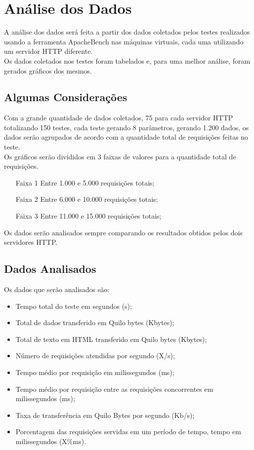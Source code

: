 \chapter{Análise dos Dados}\label{analise-dos-dados}

A análise dos dados será feita a partir dos dados coletados pelos testes realizados usando a ferramenta ApacheBench nas máquinas virtuais, cada uma utilizando um servidor HTTP diferente.\\
Os dados coletados nos testes foram tabelados e, para uma melhor análise, foram gerados gráficos dos mesmos.

\section{Algumas Considerações}
Com a grande quantidade de dados coletados, 75 para cada servidor HTTP totalizando 150 testes, cada teste gerando 8 parâmetros, gerando 1.200 dados, os dados serão agrupados de acordo com a quantidade total de requisições feitas no teste. \\
Os gráficos serão divididos em 3 faixas de valores para a quantidade total de requisições.
\begin{itemize}
	\item[Faixa 1] Entre 1.000 e 5.000 requisições totais;
	\item[Faixa 2] Entre 6.000 e 10.000 requisições totais;
	\item[Faixa 3] Entre 11.000 e 15.000 requisições totais;
\end{itemize}
Os dados serão analisados sempre comparando os resultados obtidos pelos dois servidores HTTP.\\

\section{Dados Analisados}
Os dados que serão analisados são:

\begin{itemize}
	\item Tempo total do teste em segundos (s);
	\item Total de dados transferido em Quilo bytes (Kbytes);
	\item Total de texto em HTML transferido em Quilo bytes (Kbytes);
	\item Número de requisições atendidas por segundo (X/s);
	\item Tempo médio por requisição em milissegundos (ms);
	\item Tempo médio por requisição entre as requisições concorrentes em milissegundos (ms);
	\item Taxa de transferência em Quilo Bytes por segundo (Kb/s);
	\item Porcentagem das requisições servidas em um período de tempo, tempo em milissegundos (X\%ms).
\end{itemize}

